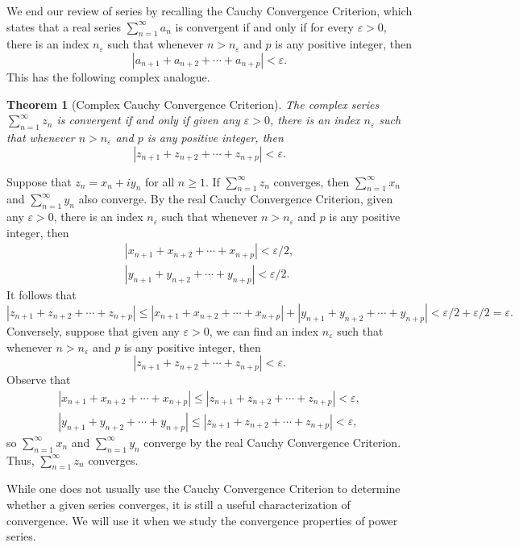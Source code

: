 \documentclass[10pt]{article}
\makeatletter
\newcommand{\eps}{\varepsilon}
\theoremstyle{newstyle}
\newtheorem{thm}{Theorem}[section]
\newenvironment{pf}[1][\proofname]{\par
  \pushQED{\qed}%
  \normalfont \topsep0\p@\relax
  \trivlist
  \item[\hskip\labelsep\scshape
  #1\@addpunct{.}]\ignorespaces
}{%
  \popQED\endtrivlist\@endpefalse
}
\makeatother
\begin{document}
We end our review of series by recalling the Cauchy Convergence Criterion, which states that a real 
series $\sum_{n=1}^\infty a_n$ is convergent if and only if for every $\eps > 0$, there is an 
index $n_{\eps}$ such that whenever $n > n_{\eps}$ and $p$ is any positive integer, then 
\[ |a_{n+1} + a_{n+2} + \cdots + a_{n+p}| < \eps. \]
This has the following complex analogue. 

\begin{thm}[Complex Cauchy Convergence Criterion] 
The complex series $\sum_{n=1}^\infty z_n$ is convergent if and only if given any 
$\eps > 0$, there is an index $n_{\eps}$ such that whenever $n > n_{\eps}$ and $p$ is 
any positive integer, then 
\[ |z_{n+1} + z_{n+2} + \cdots + z_{n+p}| < \eps. \]
\end{thm}
\begin{pf}
Suppose that $z_n = x_n + iy_n$ for all $n \geq 1$. If $\sum_{n=1}^\infty z_n$ converges, then 
$\sum_{n=1}^\infty x_n$ and $\sum_{n=1}^\infty y_n$ also converge. By the real Cauchy 
Convergence Criterion, given any $\eps > 0$, there is an index $n_{\eps}$ such that 
whenever $n > n_{\eps}$ and $p$ is any positive integer, then 
\begin{align*}
    |x_{n+1} + x_{n+2} + \cdots + x_{n+p}| < \eps/2, \\
    |y_{n+1} + y_{n+2} + \cdots + y_{n+p}| < \eps/2.
\end{align*}
It follows that 
\[ |z_{n+1} + z_{n+2} + \cdots + z_{n+p}| \leq 
|x_{n+1} + x_{n+2} + \cdots + x_{n+p}| + |y_{n+1} + y_{n+2} + \cdots + y_{n+p}| 
< \eps/2 + \eps/2 = \eps. \]
Conversely, suppose that given any $\eps > 0$, we can find an index $n_{\eps}$ such that 
whenever $n > n_{\eps}$ and $p$ is any positive integer, then 
\[ |z_{n+1} + z_{n+2} + \cdots + z_{n+p}| < \eps. \]
Observe that 
\begin{align*}
    |x_{n+1} + x_{n+2} + \cdots + x_{n+p}| \leq |z_{n+1} + z_{n+2} + \cdots + z_{n+p}| < \eps, \\
    |y_{n+1} + y_{n+2} + \cdots + y_{n+p}| \leq |z_{n+1} + z_{n+2} + \cdots + z_{n+p}| < \eps,
\end{align*} 
so $\sum_{n=1}^\infty x_n$ and $\sum_{n=1}^\infty y_n$ converge by the real Cauchy
Convergence Criterion. Thus, $\sum_{n=1}^\infty z_n$ converges. 
\end{pf}

While one does not usually use the Cauchy Convergence Criterion to determine whether a given 
series converges, it is still a useful characterization of convergence. We will use it 
when we study the convergence properties of power series. 
\end{document}
